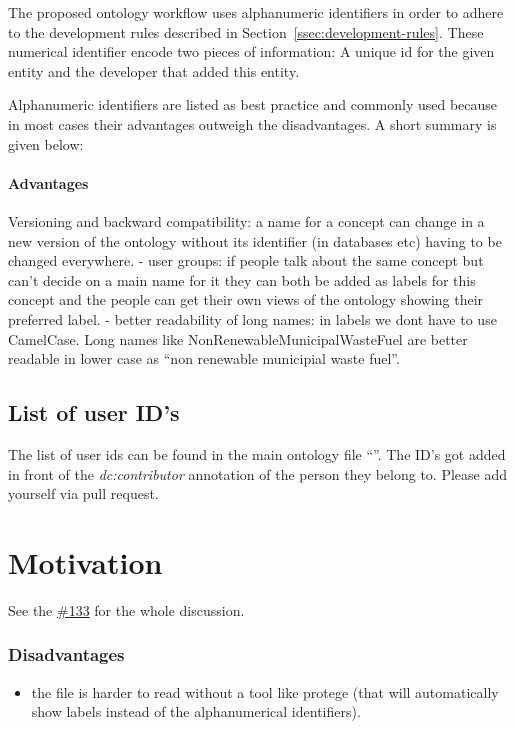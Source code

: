 The proposed ontology workflow uses alphanumeric identifiers in order to adhere to the development rules described in Section~\ref{ssec:development-rules}. These numerical identifier encode two pieces of information: A unique id for the given entity and the developer that added this entity.

Alphanumeric identifiers are listed as best
practice and commonly used because in most cases their advantages
outweigh the disadvantages. A short summary is given below:
\paragraph{Advantages} 
Versioning and backward compatibility: a name for a concept
can change in a new version of the ontology without its identifier (in
databases etc) having to be changed everywhere. - user groups: if people
talk about the same concept but can't decide on a main name for it they
can both be added as labels for this concept and the people can get
their own views of the ontology showing their preferred label. - better
readability of long names: in labels we dont have to use CamelCase. Long
names like NonRenewableMunicipalWasteFuel are better readable in lower
case as ``non renewable municipial waste fuel''.

\subsection{List of user ID's}
\label{ssec:list-of-user-ids}

The list of user ids can be found in the main ontology file
``''. The ID's got added in front of the \emph{dc:contributor}
annotation of the person they belong to. Please add yourself via pull
request.

\section{Motivation}\label{motivation}

See the
\href{https://github.com/OpenEnergyPlatform/ontology/issues/133}{\#133}
for the whole discussion. 

\hypertarget{disadvantages}{%
\subsubsection{Disadvantages}\label{disadvantages}}

\begin{itemize}
\tightlist
\item
  the file is harder to read without a tool like protege (that will
  automatically show labels instead of the alphanumerical identifiers).
\end{itemize}

